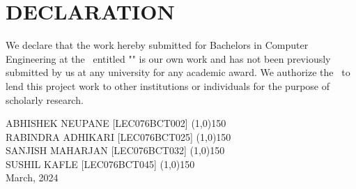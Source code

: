 \section*{DECLARATION}
\vspace{0.5cm}

We declare that the work hereby submitted for Bachelors in Computer Engineering at the \thecampus \ entitled "\textbf{\thetitle}" is our own work and has not been previously submitted by us at any university for any academic award.
We authorize the \thecampus \ to lend this project work
to other institutions or individuals for the purpose of scholarly research.

\vspace{1cm}
\noindent ABHISHEK NEUPANE [LEC076BCT002] \space{}\space{}\space{}\space{}\space{}\space{}  \line(1,0){150}\\
RABINDRA ADHIKARI [LEC076BCT025] \space{}\space{}\space{}\space{} \line(1,0){150} \\
SANJISH MAHARJAN [LEC076BCT032] \space{}\space{}\space{}\space{}\space{}\space{}\space{} \line(1,0){150} \\
SUSHIL KAFLE [LEC076BCT045] \space{}\space{}\space{}\space{}\space{}\space{}\space{}\space{}\space{}\space{}\space{}\space{}\space{}\space{}\space{}\space{}\space{}\space{}\space{}\line(1,0){150}\\


\vspace{0.7cm}
\noindent March, 2024 \\
